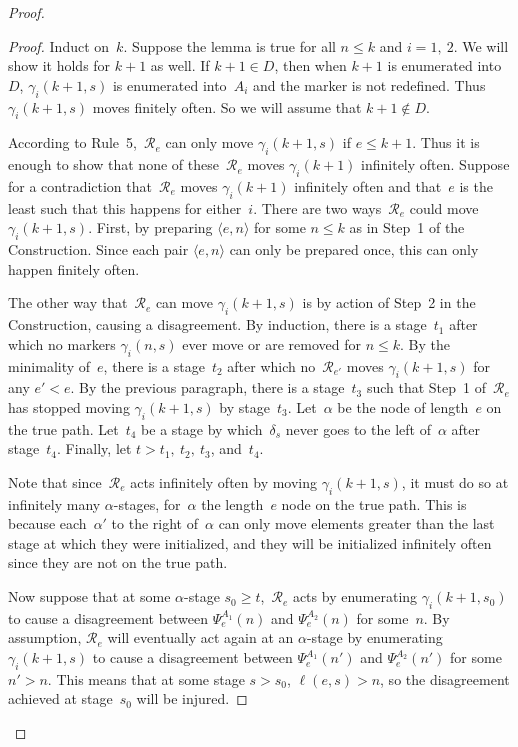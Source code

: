 \documentclass{LMCS}
\newcommand{\0}{\mathbf{0}}
\newcommand{\<}{\langle}
\renewcommand{\>}{\rangle}
\begin{document}
\begin{proof}
\begin{proof}
Induct on~$k$.  Suppose the lemma is true for all $n\leq k$ and $i=1, \ 2$.
We will show it holds for $k+1$ as well.  If $k+1\in D$, then when $k+1$ is
enumerated into~$D$, $\gamma_i(k+1,s)$ is enumerated into~$A_i$ and the
marker is not redefined.  Thus $\gamma_i(k+1,s)$ moves finitely often.  So we
will assume that $k+1\notin D$.

According to Rule~5,~$\mathcal R_e$ can only move $\gamma_i(k+1,s)$ if $e\leq
k+1$.  Thus it is enough to show that none of these~$\mathcal R_e$ moves
$\gamma_i(k+1)$ infinitely often.  Suppose for a contradiction that~$\mathcal
R_e$ moves $\gamma_i(k+1)$ infinitely often and that~$e$ is the least such
that this happens for either~$i$.  There are two ways~$\mathcal R_e$ could
move $\gamma_i(k+1, s)$.  First, by preparing $\langle e, n\rangle$ for some
$n\leq k$ as in Step~1 of the Construction.  Since each pair $\langle
e,n\rangle$ can only be prepared once, this can only happen finitely often.



The other way that~$\mathcal R_e$ can move $\gamma_i(k+1,s)$ is by action of
Step~2 in the Construction, causing a disagreement.  By induction, there is a
stage~$t_1$ after which no markers $\gamma_i(n,s)$ ever move or are removed
for $n\leq k$.  By the minimality of~$e$, there is a stage~$t_2$ after which
no~$\mathcal R_{e'}$ moves $\gamma_i(k+1,s)$ for any $e'<e$. By the previous
paragraph, there is a stage~$t_3$ such that Step~1 of~$\mathcal R_e$ has
stopped moving $\gamma_i(k+1,s)$ by stage~$t_3$.  Let~$\alpha$ be the node of
length~$e$ on the true path.  Let~$t_4$ be a stage by which~$\delta_s$ never
goes to the left of~$\alpha$ after stage~$t_4$.  Finally, let $t>t_1, \ t_2,
\ t_3$, and~$t_4$.

Note that since~$\mathcal R_e$ acts infinitely often by moving
$\gamma_i(k+1,s)$, it must do so at infinitely many $\alpha$-stages,
for~$\alpha$ the length~$e$ node on the true path.  This is because
each~$\alpha'$ to the right of~$\alpha$ can only move elements greater than
the last stage at which they were initialized, and they will be initialized
infinitely often since they are not on the true path.

Now suppose that at some $\alpha$-stage $s_0\geq t$,~$\mathcal R_e$ acts by
enumerating $\gamma_i(k+1,s_0)$ to cause a disagreement between
$\Psi_e^{A_1}(n)$ and $\Psi_e^{A_2}(n)$ for some~$n$.  By assumption,
$\mathcal R_e$ will eventually act again at an $\alpha$-stage by enumerating
$\gamma_i(k+1,s)$ to cause a disagreement between $\Psi_e^{A_1}(n')$ and
$\Psi_e^{A_2}(n')$ for some $n'>n$.  This means that at some stage $s>s_0$,
$\ell(e,s)>n$, so the disagreement achieved at stage~$s_0$ will be injured.


\end{proof}
\end{proof}
\end{document}
